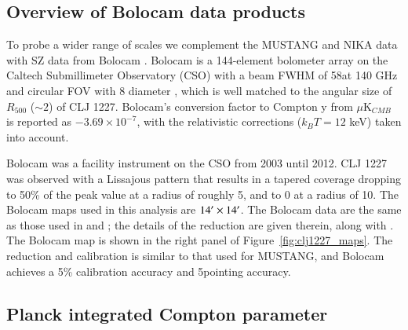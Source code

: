 \documentclass[twocolumn,traditabstract]{aa}
\begin{document}
\subsection{Overview of Bolocam data products}
\label{sec:bolocamobs}

To probe a wider range of scales we complement the MUSTANG and NIKA data with SZ data from Bolocam \citep{glenn1998}. 
Bolocam is a 144-element bolometer
array on the Caltech Submillimeter Observatory (CSO) with a beam FWHM of 58\asecs at 140 GHz and circular FOV with 8\amins 
diameter \citep{glenn1998,haig2004}, which is well matched to the angular size of $R_{500}$ ($\sim 2$\amin) of CLJ 1227. 
Bolocam's conversion factor to Compton y from $\mu$K$_{CMB}$ is reported as $-3.69 \times 10^{-7}$, with the relativistic
corrections ($k_B T = 12$ keV) taken into account.

Bolocam was a facility instrument on the CSO from
2003 until 2012. CLJ 1227 was observed with a Lissajous pattern that results in a tapered
coverage dropping to 50\% of the peak value at a radius of roughly 5\amin, and to 0 at a radius of 10\amin.
The Bolocam maps used in this analysis are $14\hbox{$^\prime$} \times 14\hbox{$^\prime$}$. The Bolocam data 
are the same as those used in \citet{czakon2015} and \citet{sayers2013}; the details of the reduction are 
given therein, along with \citet{sayers2011}. The Bolocam map is shown in the right panel of Figure~\ref{fig:clj1227_maps}.
The reduction and calibration is similar to that used for MUSTANG, and Bolocam achieves a 
5\% calibration accuracy and 5\asecs pointing accuracy.


\subsection{Planck integrated Compton parameter}
\label{sec:picp}
\end{document}
